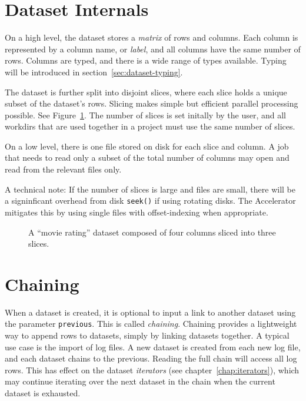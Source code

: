 \section{Dataset Internals}

On a high level, the dataset stores a \textsl{matrix} of rows and
columns.  Each column is represented by a column name,
or \emph{label}, and all columns have the same number of rows.
Columns are typed, and there is a wide range of types available.
Typing will be introduced in section~\ref{sec:dataset-typing}.

The dataset is further split into disjoint slices, where each slice
holds a unique subset of the dataset's rows.  Slicing makes simple but
efficient parallel processing possible.  See Figure~\ref{fig:slices}.
The number of slices is set initally by the user, and all workdirs
that are used together in a project must use the same number of
slices.

On a low level, there is one file stored on disk for each slice and
column.  A job that needs to read only a subset of the total number of
columns may open and read from the relevant files only.

A technical note: If the number of slices is large and files are
small, there will be a signinficant overhead from disk \texttt{seek()}
if using rotating disks.  The Accelerator mitigates this by using
single files with offset-indexing when appropriate.

\begin{figure}[b!]
  \begin{center}
     
     \caption{A ``movie rating'' dataset composed of four columns
              sliced into three slices.}
     \label{fig:slices}
  \end{center}
\end{figure}


\section{Chaining}
When a dataset is created, it is optional to input a link to another
dataset using the parameter \texttt{previous}.  This is called
\emph{chaining}.  Chaining provides a lightweight way to append rows
to datasets, simply by linking datasets together.  A typical use case
is the import of log files.  A new dataset is created from each new
log file, and each dataset chains to the previous.  Reading the full
chain will access all log rows.  This has effect on the dataset
\emph{iterators} (see chapter~\ref{chap:iterators}), which may continue iterating
over the next dataset in the chain when the current dataset is
exhausted.


